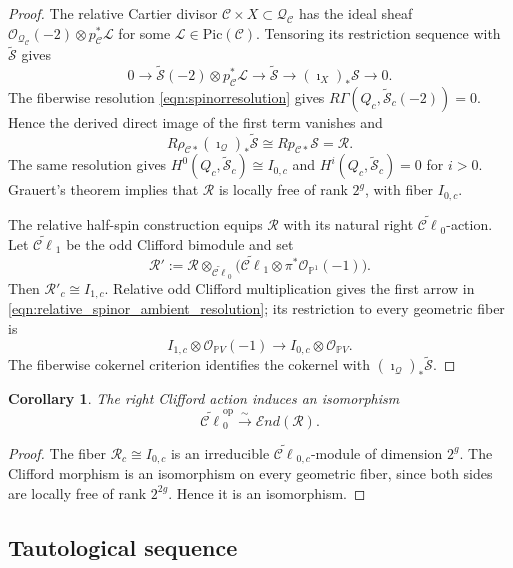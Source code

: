 \documentclass[12pt, letterpaper]{amsart}
\newtheorem{corollary}[theorem]{Corollary}
\theoremstyle{definition}
\newcommand{\PP}{\mathbb{P} }
\newcommand{\cC}{\mathcal{C} }
\newcommand{\cL}{\mathcal{L} }
\newcommand{\cO}{\mathcal{O} }
\newcommand{\cQ}{\mathcal{Q} }
\newcommand{\cR}{\mathcal{R} }
\newcommand{\cS}{\mathcal{S} }
\newcommand{\cEnd}{\mathcal{E}nd}
\def\Pic{\mathrm{Pic} }
\begin{document}
\begin{proof}
The relative Cartier divisor \(\cC\times X\subset\cQ_{\cC}\) has the ideal sheaf \(\cO_{\cQ_{\cC}}(-2)\otimes p_{\cC}^*\cL\) for some \(\cL\in\Pic(\cC)\). Tensoring its restriction sequence with \(\widetilde{\cS}\) gives
\begin{equation}\label{eqn:StildeS}
0\longrightarrow \widetilde{\cS}(-2)\otimes p_{\cC}^*\cL \longrightarrow \widetilde{\cS} \longrightarrow (\imath_X)_*\cS \longrightarrow0.
\end{equation}
The fiberwise resolution \eqref{eqn:spinorresolution} gives \(R\Gamma(Q_c,\widetilde{\cS}_c(-2))=0\). Hence the derived direct image of the first term vanishes and
\[R\rho_{\cC*}(\imath_{\cQ})_*\widetilde{\cS}\cong Rp_{\cC*}\cS=\cR.\]
The same resolution gives \(H^0(Q_c,\widetilde{\cS}_c)\cong I_{0,c}\) and \(H^i(Q_c,\widetilde{\cS}_c)=0\) for \(i>0\). Grauert's theorem implies that \(\cR\) is locally free of rank \(2^g\), with fiber \(I_{0,c}\).

The relative half-spin construction equips \(\cR\) with its natural right \(\widetilde{\cC\ell}_0\)-action. Let \(\widetilde{\cC\ell}_1\) be the odd Clifford bimodule and set
\[\cR':=\cR\otimes_{\widetilde{\cC\ell}_0} \bigl(\widetilde{\cC\ell}_1\otimes\pi^*\cO_{\PP^1}(-1)\bigr).\]
Then \(\cR'_c\cong I_{1,c}\). Relative odd Clifford multiplication gives the first arrow in \eqref{eqn:relative_spinor_ambient_resolution}; its restriction to every geometric fiber is
\[I_{1,c}\otimes\cO_{\PP V}(-1) \longrightarrow I_{0,c}\otimes\cO_{\PP V}.\]
The fiberwise cokernel criterion identifies the cokernel with \((\imath_{\cQ})_*\widetilde{\cS}\).
\end{proof}

\begin{corollary}\label{cor:Cliffordendomorphismalgebra}
The right Clifford action induces an isomorphism
\[\widetilde{\cC\ell}_0^{\mathrm{op}} \xrightarrow{\sim}\cEnd(\cR).\]
\end{corollary}

\begin{proof}
The fiber \(\cR_c\cong I_{0,c}\) is an irreducible \(\widetilde{\cC\ell}_{0,c}\)-module of dimension \(2^g\). The Clifford morphism is an isomorphism on every geometric fiber, since both sides are locally free of rank \(2^{2g}\). Hence it is an isomorphism.
\end{proof}

\subsection{Tautological sequence}
\end{document}
